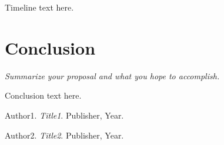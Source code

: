 \documentclass[11pt, oneside]{article}   	%
\begin{document}
Timeline text here.

\section*{Conclusion}

\textit{Summarize your proposal and what you hope to accomplish.}

Conclusion text here.

\begin{thebibliography}{9}

	Author1.
	\textit{Title1}.
	Publisher, Year.

	Author2.
	\textit{Title2}.
	Publisher, Year.

\end{thebibliography}
\end{document}
